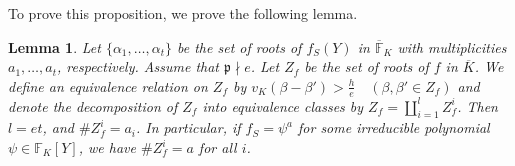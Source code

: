 \documentclass{article}
\newcommand{\field}[1]{\mathbb{#1}}
\newtheorem{lemma}[theorem]{Lemma}
\theoremstyle{definition}
\theoremstyle{remark}
\numberwithin{equation}{section}
\begin{document}
  To prove this proposition, we prove the following lemma. 

  \begin{lemma}\label{lem:classification of roots}
    Let $\{\alpha_1, \dots ,\alpha_t\}$ be the set of roots of $f_S(Y)$ in $\overline{\field{F}}_K$ 
    with multiplicities $a_1, \dots ,a_t$, respectively. Assume that $\mathfrak{p} \nmid e$. 
    Let $Z_f$ be the set of roots of $f$ in $\overline{K}$. 
    We define an equivalence relation on $Z_f$ by $v_K(\beta - \beta') > \frac{h}{e} \quad (\beta, \beta' \in Z_f)$ and 
    denote the decomposition of $Z_f$ into equivalence classes by $Z_f = \coprod_{i = 1}^l Z_f^i$. 
    Then $l = et$, and $\#Z_f^i = a_i$. 
    In particular, if $f_S = \psi^a$ for some irreducible polynomial $\psi \in \field{F}_K[Y]$, 
    we have $\#Z_f^i = a$ for all $i$. 
  \end{lemma}
\end{document}
